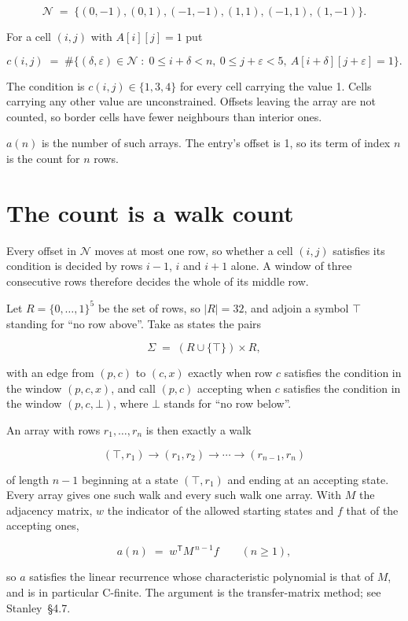 \documentclass[11pt]{article}
\theoremstyle{definition}
\begin{document}
\[\mathcal{N} \;=\; \{(0,-1), (0,1), (-1,-1), (1,1), (-1,1), (1,-1)\}.\]

For a cell $(i,j)$ with $A[i][j] = 1$ put

\[c(i,j) \;=\; \#\bigl\{(\delta,\varepsilon)\in\mathcal{N} \;:\; 0\le i+\delta<n,\ 0\le j+\varepsilon<5,\ A[i+\delta][j+\varepsilon] = 1\bigr\}.\]

The condition is $c(i,j) \in \{1, 3, 4\}$ for every cell carrying the value 1. Cells carrying any other value are unconstrained. Offsets leaving the array are not counted, so border cells have fewer neighbours than interior ones.

$a(n)$ is the number of such arrays. The entry's offset is 1, so its term of index $n$ is the count for $n$ rows.

\section{The count is a walk count}

Every offset in $\mathcal{N}$ moves at most one row, so whether a cell $(i,j)$ satisfies its condition is decided by rows $i-1$, $i$ and $i+1$ alone. A window of three consecutive rows therefore decides the whole of its middle row.

Let $R = \{0,\dots,1\}^{5}$ be the set of rows, so $|R| = 32$, and adjoin a symbol $\top$ standing for ``no row above''. Take as states the pairs

\[\Sigma \;=\; (R \cup \{\top\}) \times R,\]

with an edge from $(p,c)$ to $(c,x)$ exactly when row $c$ satisfies the condition in the window $(p,c,x)$, and call $(p,c)$ accepting when $c$ satisfies the condition in the window $(p,c,\bot)$, where $\bot$ stands for ``no row below''.

An array with rows $r_1,\dots,r_n$ is then exactly a walk

\[(\top,r_1) \to (r_1,r_2) \to \cdots \to (r_{n-1},r_n)\]

of length $n-1$ beginning at a state $(\top,r_1)$ and ending at an accepting state. Every array gives one such walk and every such walk one array. With $M$ the adjacency matrix, $w$ the indicator of the allowed starting states and $f$ that of the accepting ones,

\[a(n) \;=\; w^{\mathsf T} M^{\,n-1} f \qquad (n \ge 1),\]

so $a$ satisfies the linear recurrence whose characteristic polynomial is that of $M$, and is in particular C-finite. The argument is the transfer-matrix method; see Stanley~\S4.7.
\end{document}
